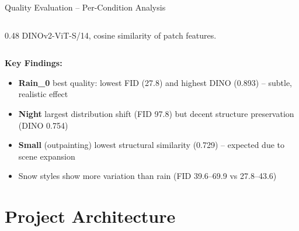 \documentclass[aspectratio=169, 10pt]{beamer}
\begin{document}
\begin{frame}{Quality Evaluation -- Per-Condition Analysis}
\begin{columns}[T]
\begin{column}{0.48\textwidth}
\vspace{0.3em}
{\scriptsize DINOv2-ViT-S/14, cosine similarity of patch features.}
\end{column}
\end{columns}

\vspace{0.5em}
\textbf{Key Findings:}
\begin{itemize}
    \item \textbf{Rain\_0} best quality: lowest FID (27.8) and highest DINO (0.893) -- subtle, realistic effect
    \item \textbf{Night} largest distribution shift (FID 97.8) but decent structure preservation (DINO 0.754)
    \item \textbf{Small} (outpainting) lowest structural similarity (0.729) -- expected due to scene expansion
    \item Snow styles show more variation than rain (FID 39.6--69.9 vs 27.8--43.6)
\end{itemize}
\end{frame}

\section{Project Architecture}
\end{document}
